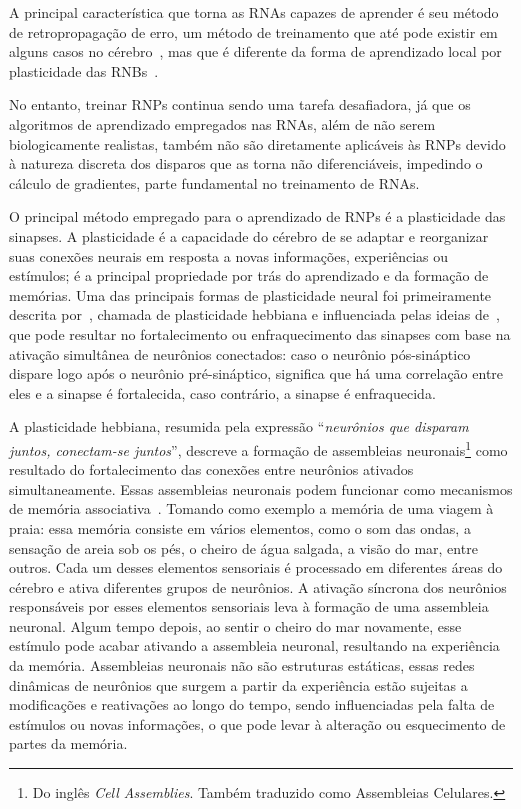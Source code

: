 A principal característica que torna as RNAs capazes de aprender é seu método de retropropagação de erro, um método de treinamento
que até pode existir em alguns casos no cérebro~\cite{lillicrapBackpropagation2020,songCan2020}, mas que é diferente da forma de
aprendizado local por plasticidade das RNBs~\cite{yamazakiSpiking2022}.

No entanto, treinar RNPs continua sendo uma tarefa desafiadora, já que os algoritmos de aprendizado empregados nas RNAs, além de
não serem biologicamente realistas, também não são diretamente aplicáveis às RNPs devido à natureza discreta dos disparos que as
torna não diferenciáveis, impedindo o cálculo de gradientes, parte fundamental no treinamento de RNAs.

O principal método empregado para o aprendizado de RNPs é a plasticidade das sinapses. A plasticidade é a capacidade do cérebro de
se adaptar e reorganizar suas conexões neurais em resposta a novas informações, experiências ou estímulos; é a principal
propriedade por trás do aprendizado e da formação de memórias. Uma das principais formas de plasticidade neural foi primeiramente
descrita por~, chamada de plasticidade hebbiana e influenciada pelas ideias
de~, que pode resultar no fortalecimento ou enfraquecimento das sinapses com base na ativação
simultânea de neurônios conectados: caso o neurônio pós-sináptico dispare logo após o neurônio pré-sináptico, significa que há uma
correlação entre eles e a sinapse é fortalecida, caso contrário, a sinapse é enfraquecida.

A plasticidade hebbiana, resumida pela expressão ``\textit{neurônios que disparam juntos, co\-nectam-se juntos}'', descreve a
formação de assembleias neuronais\footnote{Do inglês \textit{Cell Assemblies}. Também traduzido como Assembleias Celulares.} como
resultado do fortalecimento das conexões entre neurônios ativados simultaneamente. Essas assembleias neuronais podem funcionar
como mecanismos de memória associativa~\cite{sakuraiMultiple2018}. Tomando como exemplo a memória de uma viagem à praia: essa
memória consiste em vários elementos, como o som das ondas, a sensação de areia sob os pés, o cheiro de água salgada, a visão do
mar, entre outros. Cada um desses elementos sensoriais é processado em diferentes áreas do cérebro e ativa diferentes grupos de
neurônios. A ativação síncrona dos neurônios responsáveis por esses elementos sensoriais leva à formação de uma assembleia
neuronal. Algum tempo depois, ao sentir o cheiro do mar novamente, esse estímulo pode acabar ativando a assembleia neuronal,
resultando na experiência da memória. Assembleias neuronais não são estruturas estáticas, essas redes dinâmicas de neurônios que
surgem a partir da experiência estão sujeitas a modificações e reativações ao longo do tempo, sendo influenciadas pela falta de
estímulos ou novas informações, o que pode levar à alteração ou esquecimento de partes da memória.

